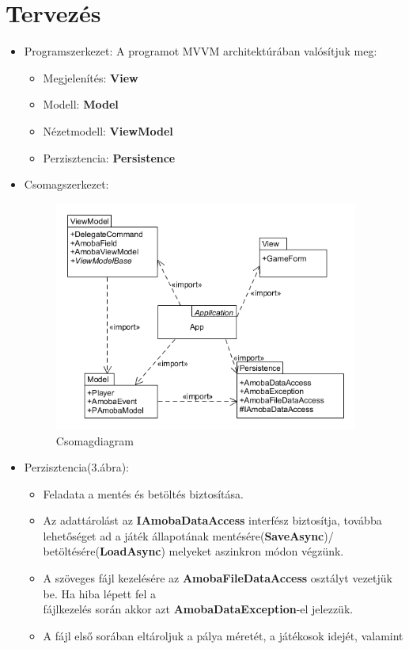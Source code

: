 \documentclass[11pt,a4paper]{article}
\begin{document}
\section{Tervezés}
\begin{itemize}
	\item Programszerkezet: A programot MVVM architektúrában valósítjuk meg:
	\begin{itemize}
		\item Megjelenítés: \textbf{View}
		\item Modell: \textbf{Model}
		\item Nézetmodell: \textbf{ViewModel}
		\item Perzisztencia: \textbf{Persistence}
	\end{itemize}
	\item Csomagszerkezet:
	\begin{figure}[h]
		\centering
		\includegraphics[width=10cm]{UMLs/Package.png}
		\caption{Csomagdiagram}
	\end{figure}
	\item Perzisztencia(3.ábra):
	\begin{itemize}
		\item Feladata a mentés és betöltés biztosítása.
		\item Az adattárolást az \textbf{IAmobaDataAccess} interfész biztosítja, továbba
		lehetőséget ad a játék állapotának mentésére(\textbf{SaveAsync})/
		betöltésére(\textbf{LoadAsync})	melyeket aszinkron módon végzünk.
		\item A szöveges fájl kezelésére az \textbf{AmobaFileDataAccess} osztályt vezetjük be.
		Ha hiba lépett fel a\\fájlkezelés során akkor azt \textbf{AmobaDataException}-el jelezzük.
		\item A fájl első sorában eltároljuk a pálya méretét, a játékosok idejét, valamint

\end{itemize}
\end{itemize}
\end{document}

